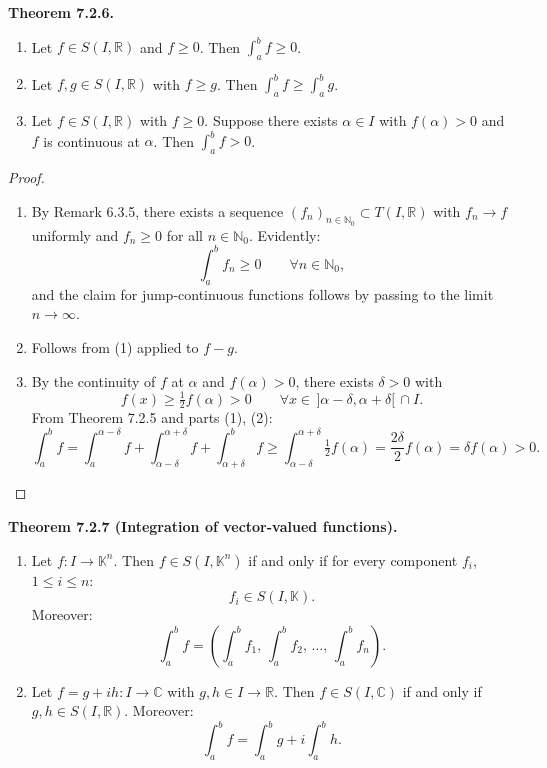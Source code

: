 \documentclass[12pt]{article}
\newenvironment{satz}[1]{%
  \par\vspace{6pt}\noindent\textbf{Theorem #1.}\itshape\space
}{%
  \par\vspace{6pt}
}
\begin{document}
\begin{satz}{7.2.6}
\begin{enumerate}
    \item Let $f\in S(I,\mathbb R)$ and $f\ge 0$. Then $\int_a^b f\ge 0$.

    \item Let $f,g\in S(I,\mathbb R)$ with $f\ge g$. Then $\int_a^b f\ge\int_a^b g$.

    \item Let $f\in S(I,\mathbb R)$ with $f\ge 0$. Suppose there exists $\alpha\in I$ with $f(\alpha)>0$ and $f$ is continuous at $\alpha$.
    Then $\int_a^b f>0$.
\end{enumerate}
\end{satz}

\begin{proof}
\begin{enumerate}
    \item By Remark 6.3.5, there exists a sequence $(f_n)_{n\in\mathbb N_0}\subset T(I,\mathbb R)$ with $f_n\to f$ uniformly
    and $f_n\ge 0$ for all $n\in\mathbb N_0$. Evidently:
    \[
    \int_a^b f_n\ge 0\qquad\forall n\in\mathbb N_0,
    \]
    and the claim for jump-continuous functions follows by passing to the limit $n\to\infty$.

    \item Follows from (1) applied to $f-g$.

    \item By the continuity of $f$ at $\alpha$ and $f(\alpha)>0$, there exists $\delta>0$ with
    \[
    f(x)\ge\tfrac{1}{2}f(\alpha)>0
    \qquad\forall x\in\,]\alpha-\delta,\alpha+\delta[\,\cap I.
    \]
    From Theorem 7.2.5 and parts (1), (2):
    \[
    \int_a^b f
    =\int_a^{\alpha-\delta}f+\int_{\alpha-\delta}^{\alpha+\delta}f+\int_{\alpha+\delta}^{b}f
    \ge\int_{\alpha-\delta}^{\alpha+\delta}\tfrac{1}{2}f(\alpha)
    =\frac{2\delta}{2}f(\alpha)
    =\delta f(\alpha)>0.
    \]
\end{enumerate}
\end{proof}

\begin{satz}{7.2.7 (Integration of vector-valued functions)}
\begin{enumerate}
    \item Let $f:I\to\mathbb K^n$. Then $f\in S(I,\mathbb K^n)$ if and only if for every component $f_i$,
    $1\le i\le n$:
    \[
    f_i\in S(I,\mathbb K).
    \]
    Moreover:
    \[
    \int_a^b f=\left(\int_a^b f_1,\,\int_a^b f_2,\,\ldots,\,\int_a^b f_n\right).
    \]

    \item Let $f=g+ih:I\to\mathbb C$ with $g,h\in I\to\mathbb R$. Then $f\in S(I,\mathbb C)$ if and only if
    $g,h\in S(I,\mathbb R)$. Moreover:
    \[
    \int_a^b f=\int_a^b g+i\int_a^b h.
    \]
\end{enumerate}
\end{satz}
\end{document}
